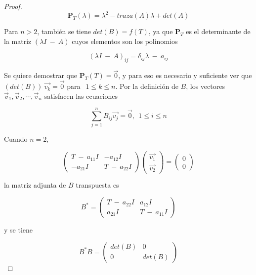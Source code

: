 \begin{corollary}
\begin{proof}
$$\mathbf{P}_T(\lambda)=\lambda^{2}-traza(A)\lambda+det(A)$$

\bigskip

Para $n>2$, también se tiene $det(B)=f(T)$, ya que $\mathbf{P}_T$ es el determinante de la matriz $(\lambda I  ~-~   A    )$ cuyos elementos son los polinomios 

\bigskip

$$(\lambda I   ~-~   A )_{ij}=\delta_{ij} \lambda  ~-~   a _{ij}$$

\bigskip

Se quiere demostrar que $\mathbf{P}_T(T)=\vec{0}$, y para eso es necesario y suficiente ver que $(det(B)) ~\vec{v_k}=\vec{0}$ para $~~1\leq k \leq n$.
Por la definición de $B$, los vectores $\vec{v}_1,\vec{v}_2,\cdots, \vec{v}_n$ satisfacen las ecuaciones

\bigskip

$$\sum^{n}_{j=1}B_{ij}\vec{v_j}=\vec{0},~~1\leq i \leq n $$

\bigskip

\bigskip

Cuando $n=2$,

$$\left(\begin{array}{cc} T ~-~  a_{11}I& -a_{12}I  \\ -a_{21}I &  T~-~  a_{22} I
\end{array}
 \right)\left(\begin{array}{c} \vec{v_1} \\ \vec{v_2} 
 \end{array}\right)= \left(\begin{array}{c} 0 \\ 0
 \end{array}\right)$$




\bigskip

\noindent
la matriz adjunta  de $B$ transpuesta  es

$$B^{*}=\left(\begin{array}{cc}  T~-~  a_{22} I & a_{12}I  \\ a_{21}I & T ~-~  a_{11}I
\end{array}
 \right)$$

\bigskip
\noindent
y se tiene 

$$B^{*}B=\left(\begin{array}{cc}  det(B) & 0 \\ 0 & det(B)
\end{array}
 \right)$$

\bigskip


\end{proof}
\end{corollary}

